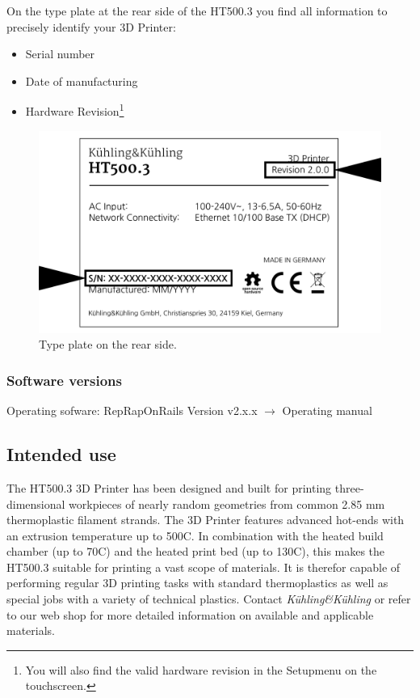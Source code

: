  On the type plate at the rear side of the HT500.3 you find all information to precisely identify your 3D Printer:

\begin{itemize}
  \item Serial number
  \item Date of manufacturing
  \item Hardware Revision\footnote{You will also find the valid hardware revision in the \lbrack Setup\rbrack  menu on the touchscreen.}
\end{itemize}

\begin{figure}[H]
  \centering
  \includegraphics[width=.7\linewidth]{./img/type_plate_ht500-3.png}
  \caption{Type plate on the rear side.}
\end{figure}


\subsubsection{Software versions}

Operating sofware:
RepRapOnRails Version v2.x.x $\rightarrow$ Operating manual



\subsection{Intended use}

The HT500.3 3D Printer has been designed and built for printing three-dimensional workpieces of nearly random geometries from common 2.85 mm 
thermoplastic filament strands.
The 3D Printer features advanced hot-ends with an extrusion temperature up to 500\degree C. 
In combination with the heated build chamber (up to 70\degree C) and the heated print bed (up to 130\degree C), this makes the HT500.3 
suitable for printing a vast scope of materials. It is therefor capable of performing regular 3D printing tasks with standard thermoplastics
as well as special jobs with a variety of technical plastics.
Contact \emph{Kühling\&Kühling} or refer to our web shop for more detailed information on available and applicable materials.

